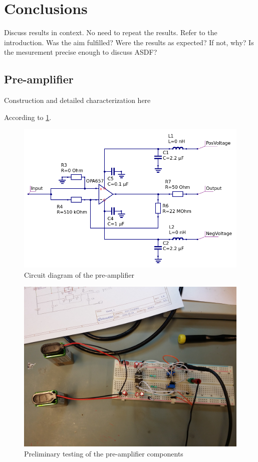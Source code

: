 \documentclass[a4paper]{article}
\begin{document}
\clearpage
\section{Conclusions}
\label{conclusions}
Discuss results in context.
No need to repeat the results.
Refer to the introduction.
Was the aim fulfilled?
Were the results as expected? If not, why?
Is the mesurement precise enough to discuss ASDF?


\clearpage
\begin{appendices}

\section{Pre-amplifier}
\label{pre_amp}

Construction and detailed characterization here

According to \ref{fig:pre_amp_schematic}.

\begin{figure}[ht!]
\centering
\includegraphics[width=\textwidth]{fig/amp-schematic/amplifier.png}
\caption{Circuit diagram of the pre-amplifier}
\label{fig:pre_amp_schematic}
\end{figure}


\begin{figure}[ht!]
\centering
\includegraphics[width=\textwidth]{fig/IMG_20201005_104331.jpg}
\caption{Preliminary testing of the pre-amplifier components}
\end{figure}



\end{appendices}
\end{document}
